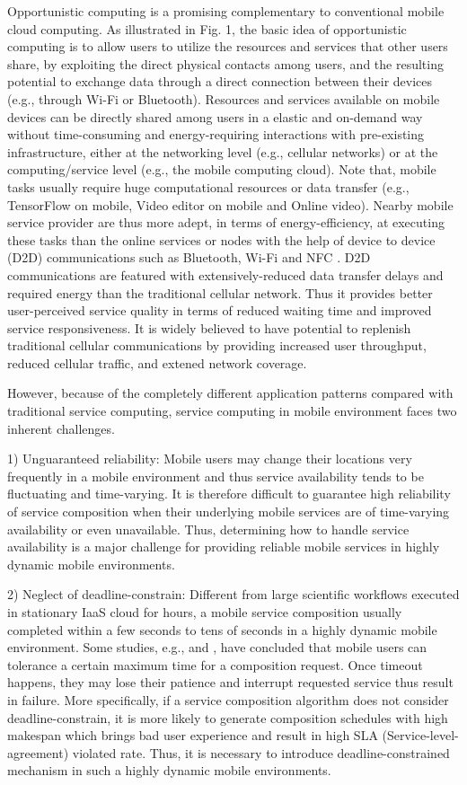 \documentclass[journal]{IEEEtran}
\begin{document}
Opportunistic computing is a promising complementary to conventional mobile cloud computing. As illustrated in Fig. 1, the basic idea of opportunistic computing is to allow users to utilize the resources and services that other users share, by exploiting the direct physical contacts among users, and the resulting potential to exchange data through a direct connection between their devices (e.g., through Wi-Fi or Bluetooth). Resources and services available on mobile devices can be directly shared among users in a elastic and on-demand way without time-consuming and energy-requiring interactions with pre-existing infrastructure, either at the networking level (e.g., cellular networks) or at the computing/service level (e.g., the mobile computing cloud). 
Note that, mobile tasks usually require huge computational resources or data transfer (e.g., TensorFlow on mobile, Video editor on mobile and Online video). Nearby mobile service provider are thus more adept, in terms of energy-efficiency, at executing these tasks than the online services or nodes with the help of device to device (D2D) communications such as Bluetooth, Wi-Fi and NFC \cite{balani2007energy}. D2D communications are featured with extensively-reduced data transfer delays and required energy than the traditional cellular network. Thus it provides better user-perceived service quality in terms of reduced waiting time and improved service responsiveness. It is widely believed to have potential to replenish traditional cellular communications by providing increased user throughput, reduced cellular traffic, and extened network coverage.

However, because of the completely different application patterns compared with traditional service computing, service computing in mobile environment faces two inherent challenges.

1) Unguaranteed reliability: Mobile users may change their locations very frequently in a mobile environment and thus service availability tends to be fluctuating and time-varying. It is therefore difficult to guarantee high reliability of service composition when their underlying mobile services are of time-varying availability or even unavailable. Thus, determining how to handle service availability is a major challenge for providing reliable mobile services in highly dynamic mobile environments.

2) Neglect of deadline-constrain: Different from large scientific workflows executed in stationary IaaS cloud for hours, a mobile service composition usually completed within a few seconds to tens of seconds in a highly dynamic mobile environment. Some studies, e.g., \cite{Niida2010} and \cite{zhou2016define} , have concluded that mobile users can tolerance a certain maximum time for a composition request. Once timeout happens, they may lose their patience and interrupt requested service thus result in failure. More specifically, if a service composition algorithm does not consider deadline-constrain, it is more likely to generate composition schedules with high makespan which brings bad user experience and result in high SLA (Service-level-agreement) violated rate. Thus, it is necessary to introduce deadline-constrained mechanism in such a highly dynamic mobile environments.
\end{document}
